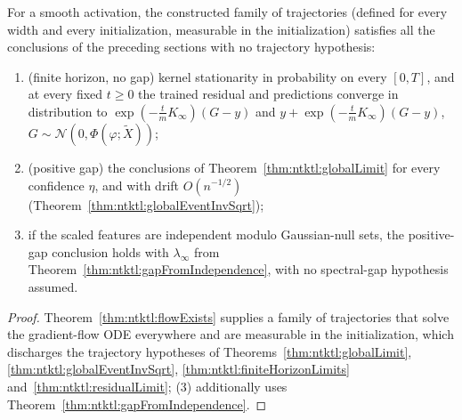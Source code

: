 \begin{theorem}\label{thm:ntktl:constructedLimits}
  \leanok
For a smooth activation, the constructed family of trajectories (defined for every width and every initialization, measurable in the initialization) satisfies all the conclusions of the preceding sections with no trajectory hypothesis:
\begin{enumerate}
  \item (finite horizon, no gap) kernel stationarity in probability on every $[0,T]$, and at every fixed $t\ge0$ the trained residual and predictions converge in distribution to $\exp(-\tfrac tmK_\infty)(G-y)$ and $y+\exp(-\tfrac tmK_\infty)(G-y)$, $G\sim\mathcal N(0,\Phi(\varphi;\tilde X))$;
  \item (positive gap) the conclusions of Theorem~\ref{thm:ntktl:globalLimit} for every confidence $\eta$, and with drift $O(n^{-1/2})$ (Theorem~\ref{thm:ntktl:globalEventInvSqrt});
  \item if the scaled features are independent modulo Gaussian-null sets, the positive-gap conclusion holds with $\lambda_\infty$ from Theorem~\ref{thm:ntktl:gapFromIndependence}, with no spectral-gap hypothesis assumed.
\end{enumerate}
\end{theorem}

\begin{proof}
  \leanok
Theorem~\ref{thm:ntktl:flowExists} supplies a family of trajectories that solve the gradient-flow ODE everywhere and are measurable in the initialization, which discharges the trajectory hypotheses of Theorems~\ref{thm:ntktl:globalLimit}, \ref{thm:ntktl:globalEventInvSqrt}, \ref{thm:ntktl:finiteHorizonLimits} and~\ref{thm:ntktl:residualLimit}; (3) additionally uses
Theorem~\ref{thm:ntktl:gapFromIndependence}.
\end{proof}


